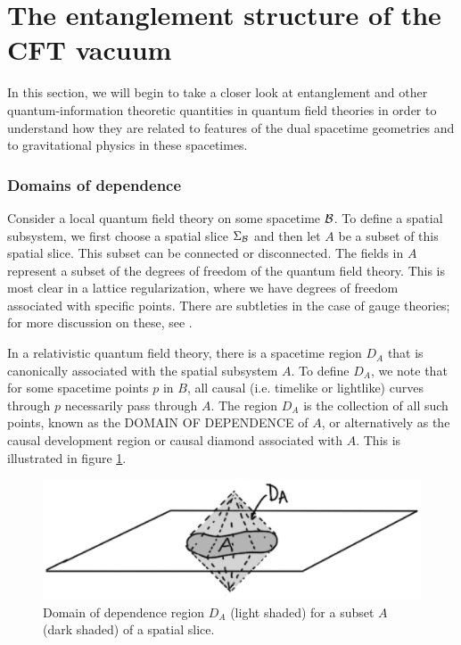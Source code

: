 \documentclass[12pt,epsf]{article}
\begin{document}
\section{The entanglement structure of the CFT vacuum}

In this section, we will begin to take a closer look at entanglement and other quantum-information theoretic quantities in quantum field theories in order to understand how they are related to features of the dual spacetime geometries and to gravitational physics in these spacetimes.

\subsubsection*{Domains of dependence}

Consider a local quantum field theory on some spacetime ${\cal B}$. To define a spatial subsystem, we first choose a spatial slice $\Sigma_{\cal B}$ and then let $A$ be a subset of this spatial slice. This subset can be connected or disconnected. The fields in $A$ represent a subset of the degrees of freedom of the quantum field theory. This is most clear in a lattice regularization, where we have degrees of freedom associated with specific points. There are subtleties in the case of gauge theories; for more discussion on these, see \cite{Donnelly:2011hn,Casini:2013rba}.

In a relativistic quantum field theory, there is a spacetime region $D_A$ that is canonically associated with the spatial subsystem $A$. To define $D_A$, we note that for some spacetime points $p$ in $B$, all causal (i.e. timelike or lightlike) curves through $p$ necessarily pass through $A$. The region $D_A$ is the collection of all such points, known as the DOMAIN OF DEPENDENCE of $A$, or alternatively as the causal development region or causal diamond associated with $A$. This is illustrated in figure \ref{DomD}.

\begin{figure}
\centering
\includegraphics[width = 0.7 \textwidth]{DomD.eps}
\caption{Domain of dependence region $D_A$ (light shaded) for a subset $A$ (dark shaded) of a spatial slice.}
\label{DomD}
\end{figure}
\end{document}
